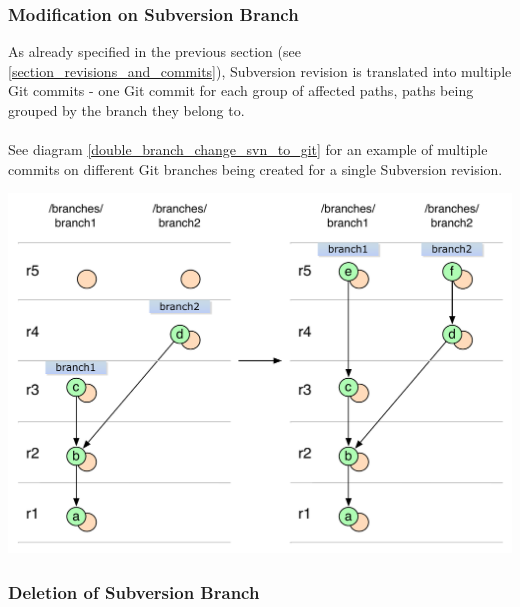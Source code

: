 \subsubsection{Modification on Subversion Branch}

As already specified in the previous section (see \ref{section_revisions_and_commits}), Subversion
revision is translated into multiple Git commits - one Git commit for each group of 
affected paths, paths being grouped by the branch they belong to.
\\\\
See diagram \ref{double_branch_change_svn_to_git} for an example of multiple commits 
on different Git branches being created for a single Subversion revision.

\begin{center}
\includegraphics[width=\textwidth]{img/diagrams/double_branch_change_svn_to_git.pdf}%
\label{double_branch_change_svn_to_git}%
\end{center}

\subsubsection{Deletion of Subversion Branch}

